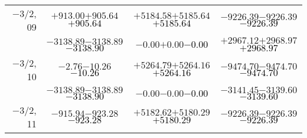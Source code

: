 \documentclass[compress]{beamer}
\begin{document}
\begin{frame}
{\begin{tabular}{r | c | c | c}
$-$3/2, 09 & $+913.00$\hspace{0.1 cm}$+905.64$\hspace{0.1 cm}\textcolor{black}{$+905.64$} & $+5184.58$\hspace{0.1 cm}$+5185.64$\hspace{0.1 cm}\textcolor{black}{$+5185.64$} & $-9226.39$\hspace{0.1 cm}$-9226.39$\hspace{0.1 cm}\textcolor{black}{$-9226.39$} \\
           & $-3138.89$\hspace{0.1 cm}$-3138.89$\hspace{0.1 cm}\textcolor{black}{$-3138.90$} & $-0.00$\hspace{0.1 cm}$+0.00$\hspace{0.1 cm}\textcolor{black}{$-0.00$} & $+2967.12$\hspace{0.1 cm}$+2968.97$\hspace{0.1 cm}\textcolor{black}{$+2968.97$} \\
$-$3/2, 10 & $-2.76$\hspace{0.1 cm}$-10.26$\hspace{0.1 cm}\textcolor{black}{$-10.26$} & $+5264.79$\hspace{0.1 cm}$+5264.16$\hspace{0.1 cm}\textcolor{black}{$+5264.16$} & $-9474.70$\hspace{0.1 cm}$-9474.70$\hspace{0.1 cm}\textcolor{black}{$-9474.70$} \\
           & $-3138.89$\hspace{0.1 cm}$-3138.89$\hspace{0.1 cm}\textcolor{black}{$-3138.90$} & $-0.00$\hspace{0.1 cm}$-0.00$\hspace{0.1 cm}\textcolor{black}{$-0.00$} & $-3141.45$\hspace{0.1 cm}$-3139.60$\hspace{0.1 cm}\textcolor{black}{$-3139.60$} \\
$-$3/2, 11 & $-915.94$\hspace{0.1 cm}$-923.28$\hspace{0.1 cm}\textcolor{black}{$-923.28$} & $+5182.62$\hspace{0.1 cm}$+5180.29$\hspace{0.1 cm}\textcolor{black}{$+5180.29$} & $-9226.39$\hspace{0.1 cm}$-9226.39$\hspace{0.1 cm}\textcolor{black}{$-9226.39$} \\

\end{tabular}}
\end{frame}
\end{document}
